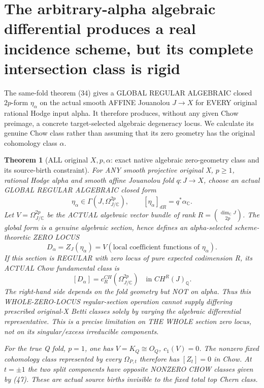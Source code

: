 \documentclass[11pt]{article}
\newtheorem{theorem}{Theorem}[section]
\begin{document}
\section{The arbitrary-alpha algebraic differential produces a real incidence scheme, but its complete intersection class is rigid}
The same-fold theorem (34) gives a GLOBAL
REGULAR ALGEBRAIC closed $2p$-form
$\eta_\alpha$ on the actual smooth AFFINE
Jouanolou $J\to X$ for EVERY original
rational Hodge input alpha.
It therefore produces, without any given
Chow preimage, a concrete target-selected
algebraic degeneracy locus. We calculate its
genuine Chow class rather than assuming
that its zero geometry has the original
cohomology class $\alpha$.

\begin{theorem}[ALL original $X,p,\alpha$: exact native algebraic zero-geometry class and its source-birth constraint]
For ANY smooth projective original X,
$p\ge1$, rational Hodge alpha and smooth
affine Jouanolou fold $q:J\to X$,
choose an actual GLOBAL REGULAR ALGEBRAIC
closed form
\[
 \eta_\alpha\in
   \Gamma(J,\Omega_{J/\mathbb C}^{2p}),
 \qquad [\eta_\alpha]_{dR}=q^*\alpha_\mathbb C .
\]
Let $V=\Omega_{J/\mathbb C}^{2p}$ be the
ACTUAL algebraic vector bundle of rank
$R={\dim_\mathbb C J\choose 2p}$.
The global form is a genuine algebraic
section, hence defines an alpha-selected
scheme-theoretic ZERO LOCUS
\[
 D_\alpha=Z_J(\eta_\alpha)
    =V(\text{local coefficient functions of }\eta_\alpha).
\]
If this section is REGULAR with zero
locus of pure expected codimension R,
its ACTUAL Chow fundamental class is
\[
 \boxed{
 [D_\alpha]=c_R^{CH}
       (\Omega_{J/\mathbb C}^{2p})
 \quad\text{in }CH^R(J)_{\mathbb Q}.
 }                                                 \tag{52}
\]
The right-hand side depends on the
fold geometry but NOT on alpha.
Thus this WHOLE-ZERO-LOCUS regular-section
operation cannot supply differing
prescribed original-X Betti classes
solely by varying the algebraic
differential representative.
This is a precise limitation on
THE WHOLE section zero locus, not
on its singular/excess irreducible
components.

For the true Q fold, $p=1$, one has
$V=K_Q\cong O_Q$, $c_1(V)=0$.
The nonzero fixed cohomology class
represented by every $\Omega_{P,t}$
therefore has $[Z_t]=0$ in Chow.
At $t=\pm1$ the two split components
have opposite NONZERO CHOW classes
given by (47). These are actual
source births invisible to the fixed
total top Chern class.
\end{theorem}
\end{document}
